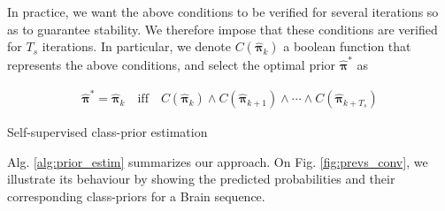 In practice, we want the above conditions to be verified for several iterations so as to guarantee stability.
We therefore impose that these conditions are verified for $T_{s}$ iterations.
In particular, we denote $C(\bm{\hat \pi}_{k})$ a boolean function that represents the above conditions, and select the optimal prior $\bm{\hat \pi}^{*}$ as

\begin{multline}
  \label{eq:prior_opt}
  \bm{\hat \pi}^{*} = \bm{\hat \pi}_{k} \quad \text{iff} \quad C(\bm{\hat \pi}_{k}) \wedge
  C(\bm{\hat \pi}_{k+1})
  \wedge \cdots \wedge  C(\bm{\hat \pi}_{k+T_{s}})
\end{multline}


\begin{algorithm}[H]
\caption{Self-supervised class-prior estimation}
\label{alg:prior_estim}
\begin{algorithmic}[1]
\Require{$\hat \pi_{0}$: Upper-bound on class-priors \newline
  $T$: Number of epochs \newline
  $f_\theta$: Foreground prediction model
\Ensure {Optimal estimate of class-prior $\bm{\hat{\pi}}^{*}$}
\State $k \gets 0$
\While {Stopping condition is not verified}
    \State Optimize $f_\theta$ for $1$ epoch as in Alg. \ref{alg:sgdnnpu} using priors $\bm{\hat{\pi}}_{k}$
    \State Forward pass all images to get $\bm{y}_k$
    \State Compute observations $\bm{\rho}_k$ from $\bm{y}_{k}$ as in Eq. \ref{eq:observ}
    \State Clip $\bm{\rho}_{k}$ to $[0,\hat \pi_{0}]$
    \State Denote $\bm{\hat\Pi}_{k-1}$ the sigma-points of $\bm{\hat\pi}_{k-1}$
    \State Clip $\bm{\hat\Pi}_{k}$ to $[0, \hat \pi_{0}]$
    \State Transform $\bm{\hat\Pi}$ through the state-transition function to get $\bm{\hat\Pi}_{k+1}^{-}$
    \State Clip $\bm{\hat\Pi}_{k+1}^{-}$ to $[0, \hat \pi_{0}]$
    \State Compute a-posteriori state $\bm{\hat\pi}_{k+1}$ using observations $\bm{\rho}_{k}$
    \State $k \gets k+1$
\end{algorithmic}
\end{algorithm}

Alg. \ref{alg:prior_estim} summarizes our approach.
On Fig. \ref{fig:prevs_conv}, we illustrate its behaviour by showing the predicted probabilities and their corresponding class-priors for a Brain sequence.

